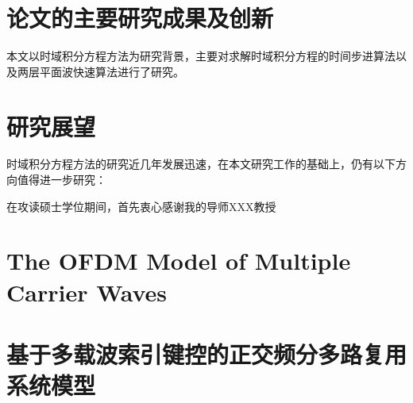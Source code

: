 \documentclass[promaster]{thesis-uestc}
\begin{document}
\section{论文的主要研究成果及创新}
本文以时域积分方程方法为研究背景，主要对求解时域积分方程的时间步进算法以及两层平面波快速算法进行了研究。

\section{研究展望}
时域积分方程方法的研究近几年发展迅速，在本文研究工作的基础上，仍有以下方向值得进一步研究：

\thesisacknowledgement
在攻读硕士学位期间，首先衷心感谢我的导师XXX教授







%
% 
%
% 
% 
%


\thesistranslationoriginal
\section{The OFDM Model of Multiple Carrier Waves}

\thesistranslationchinese
\section{基于多载波索引键控的正交频分多路复用系统模型}
\end{document}
